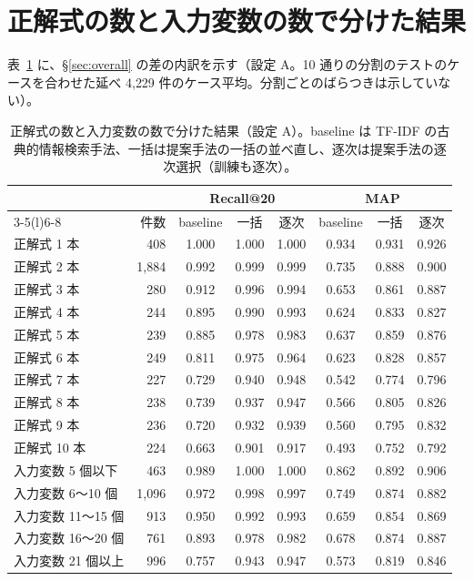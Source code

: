 \documentclass[11pt,a4paper]{ltjsarticle}
\begin{document}
\section{正解式の数と入力変数の数で分けた結果}\label{app:bucket}
表~\ref{tab:bucket} に、\S\ref{sec:overall} の差の内訳を示す（設定 A。10 通りの分割のテストのケースを合わせた延べ 4{,}229 件のケース平均。分割ごとのばらつきは示していない）。

\begin{table}[h]\centering
\small
\caption{正解式の数と入力変数の数で分けた結果（設定 A）。baseline は TF-IDF の古典的情報検索手法、一括は提案手法の一括の並べ直し、逐次は提案手法の逐次選択（訓練も逐次）。}
\label{tab:bucket}
\footnotesize
\setlength{\tabcolsep}{3pt}
\begin{tabular}{@{}lrcccccc@{}}
\toprule
 & & \multicolumn{3}{c}{Recall@20} & \multicolumn{3}{c}{MAP} \\
\cmidrule(lr){3-5}\cmidrule(l){6-8}
 & 件数 & baseline & 一括 & 逐次 & baseline & 一括 & 逐次 \\
\midrule
正解式 1 本 & 408 & 1.000 & 1.000 & 1.000 & 0.934 & 0.931 & 0.926 \\
正解式 2 本 & 1{,}884 & 0.992 & 0.999 & 0.999 & 0.735 & 0.888 & 0.900 \\
正解式 3 本 & 280 & 0.912 & 0.996 & 0.994 & 0.653 & 0.861 & 0.887 \\
正解式 4 本 & 244 & 0.895 & 0.990 & 0.993 & 0.624 & 0.833 & 0.827 \\
正解式 5 本 & 239 & 0.885 & 0.978 & 0.983 & 0.637 & 0.859 & 0.876 \\
正解式 6 本 & 249 & 0.811 & 0.975 & 0.964 & 0.623 & 0.828 & 0.857 \\
正解式 7 本 & 227 & 0.729 & 0.940 & 0.948 & 0.542 & 0.774 & 0.796 \\
正解式 8 本 & 238 & 0.739 & 0.937 & 0.947 & 0.566 & 0.805 & 0.826 \\
正解式 9 本 & 236 & 0.720 & 0.932 & 0.939 & 0.560 & 0.795 & 0.832 \\
正解式 10 本 & 224 & 0.663 & 0.901 & 0.917 & 0.493 & 0.752 & 0.792 \\
\midrule
入力変数 5 個以下 & 463 & 0.989 & 1.000 & 1.000 & 0.862 & 0.892 & 0.906 \\
入力変数 6〜10 個 & 1{,}096 & 0.972 & 0.998 & 0.997 & 0.749 & 0.874 & 0.882 \\
入力変数 11〜15 個 & 913 & 0.950 & 0.992 & 0.993 & 0.659 & 0.854 & 0.869 \\
入力変数 16〜20 個 & 761 & 0.893 & 0.978 & 0.982 & 0.678 & 0.874 & 0.887 \\
入力変数 21 個以上 & 996 & 0.757 & 0.943 & 0.947 & 0.573 & 0.819 & 0.846 \\
\bottomrule
\end{tabular}
\end{table}
\end{document}
